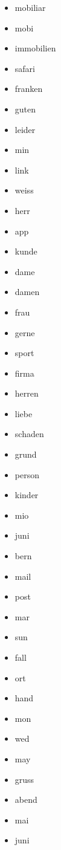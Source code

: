 \begin{multicols}{4}
    \begin{itemize}
        \item mobiliar
        \item mobi
        \item immobilien
        \item safari
        \item franken
        \item guten
        \item leider
        \item min
        \item link
        \item weiss
        \item herr
        \item app
        \item kunde
        \item dame
        \item damen
        \item frau
        \item gerne
        \item sport
        \item firma
        \item herren
        \item liebe
        \item schaden
        \item grund
        \item person
        \item kinder
        \item mio
        \item juni
        \item bern
        \item mail
        \item post
        \item mar
        \item sun
        \item fall
        \item ort
        \item hand
        \item mon
        \item wed
        \item may
        \item gruss
        \item abend
        \item mai
        \item juni

\end{itemize}
\end{multicols}
